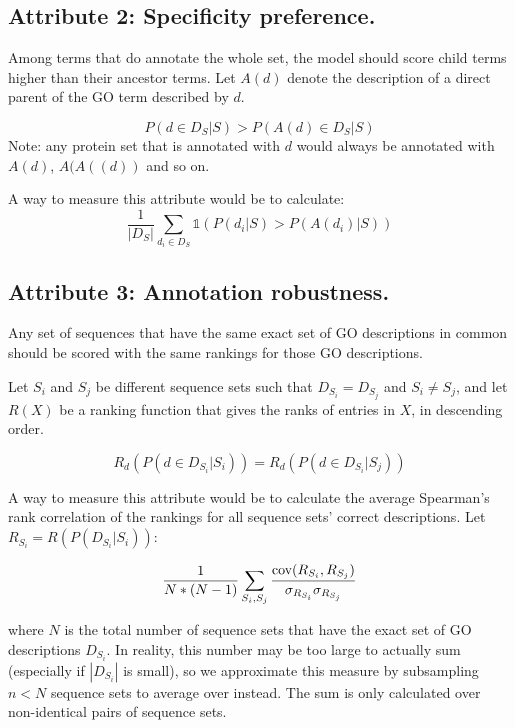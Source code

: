 \documentclass{article}
\begin{document}
        \subsection{Attribute 2: Specificity preference.}

        Among terms that do annotate the whole set, the model should score child terms higher than their ancestor terms.
Let $A(d)$ denote the description of a direct parent of the GO term described by $d$.

        \[P(d \in D_{S}| S) > P(A(d) \in D_{S}| S)\]
        Note: any protein set that is annotated with $d$ would always be annotated with $A(d)$, $A(A((d))$ and so on.

        A way to measure this attribute would be to calculate:
        \[\frac{1}{|D_{S}|}\sum_{d_i \in D_{S}} \mathds{1}(P(d_i | S) > P(A(d_i) | S))\]

        \subsection{Attribute 3: Annotation robustness.}

        Any set of sequences that have the same exact set of GO descriptions in common should be scored with the same rankings for those GO descriptions.

        Let $S_i$ and $S_j$ be different sequence sets such that $D_{S_i} = D_{S_j}$ and $S_i \neq S_j$, and let $R(X)$ be a ranking function that gives the ranks of entries in $X$, in descending order.

        \[R_{d}(P(d \in D_{S_i} | S_i)) = R_{d}(P(d \in D_{S_i} | S_j))\]

        A way to measure this attribute would be to calculate the average Spearman's rank correlation of the rankings for all sequence sets' correct descriptions.
Let $R_{S_i} = R(P(D_{S_i} | S_i))$:

        \[\frac{1}{N*(N-1)}\sum_{S_i, S_j} \frac{\textnormal{cov}(R_{S_i}, R_{S_j})}{\sigma_{R_{S_i}}\sigma_{R_{S_j}}}\]

        where $N$ is the total number of sequence sets that have the exact set of GO descriptions $D_{S_i}$.
In reality, this number may be too large to actually sum (especially if $|D_{S_i}|$ is small), so we approximate this measure by subsampling $n < N$ sequence sets to average over instead.
The sum is only calculated over non-identical pairs of sequence sets.
\end{document}
